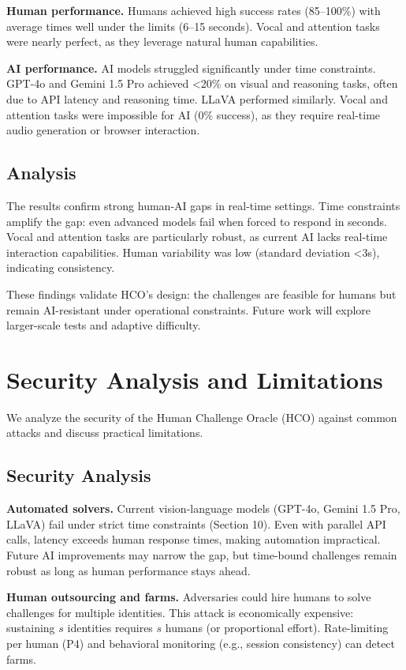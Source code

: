 \documentclass[sigconf,nonacm]{acmart}
\begin{document}
\textbf{Human performance.} Humans achieved high success rates (85--100\%) with average times well under the limits (6--15 seconds). Vocal and attention tasks were nearly perfect, as they leverage natural human capabilities.

\textbf{AI performance.} AI models struggled significantly under time constraints. GPT-4o and Gemini 1.5 Pro achieved <20\% on visual and reasoning tasks, often due to API latency and reasoning time. LLaVA performed similarly. Vocal and attention tasks were impossible for AI (0\% success), as they require real-time audio generation or browser interaction.

\subsection{Analysis}

The results confirm strong human-AI gaps in real-time settings. Time constraints amplify the gap: even advanced models fail when forced to respond in seconds. Vocal and attention tasks are particularly robust, as current AI lacks real-time interaction capabilities. Human variability was low (standard deviation <3s), indicating consistency.

These findings validate HCO's design: the challenges are feasible for humans but remain AI-resistant under operational constraints. Future work will explore larger-scale tests and adaptive difficulty.

\section{Security Analysis and Limitations}

We analyze the security of the Human Challenge Oracle (HCO) against common attacks and discuss practical limitations.

\subsection{Security Analysis}

\textbf{Automated solvers.} Current vision-language models (GPT-4o, Gemini 1.5 Pro, LLaVA) fail under strict time constraints (Section 10). Even with parallel API calls, latency exceeds human response times, making automation impractical. Future AI improvements may narrow the gap, but time-bound challenges remain robust as long as human performance stays ahead.

\textbf{Human outsourcing and farms.} Adversaries could hire humans to solve challenges for multiple identities. This attack is economically expensive: sustaining $s$ identities requires $s$ humans (or proportional effort). Rate-limiting per human (P4) and behavioral monitoring (e.g., session consistency) can detect farms.
\end{document}
